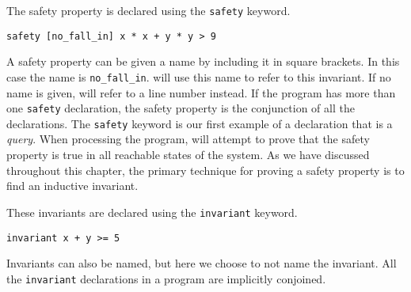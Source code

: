 The safety property is declared using the \lstinline[language=mypyvy]{safety} keyword.
\begin{lstlisting}[language=mypyvy, xleftmargin=.2\textwidth, xrightmargin=.2\textwidth]
safety [no_fall_in] x * x + y * y > 9
\end{lstlisting}
A safety property can be given a name by including it in square brackets.
In this case the name is \texttt{no\_fall\_in}.
\mypyvy will use this name to refer to this invariant.
If no name is given, \mypyvy will refer to a line number instead.
If the program has more than one \lstinline[language=mypyvy]{safety} declaration,
  the safety property is the conjunction of all the declarations.
The \lstinline[language=mypyvy]{safety} keyword is our first example of
  a declaration that is a \emph{query}.
When processing the program, \mypyvy will attempt to prove that
  the safety property is true in all reachable states of the system.
As we have discussed throughout this chapter,
  the primary technique for proving a safety property is
  to find an inductive invariant.

These invariants are declared using the \lstinline[language=mypyvy]{invariant} keyword.
\begin{lstlisting}[language=mypyvy, xleftmargin=.2\textwidth, xrightmargin=.2\textwidth]
invariant x + y >= 5
\end{lstlisting}
Invariants can also be named, but here we choose to not name the invariant.
All the \lstinline[language=mypyvy]{invariant} declarations in a program are
  implicitly conjoined.

